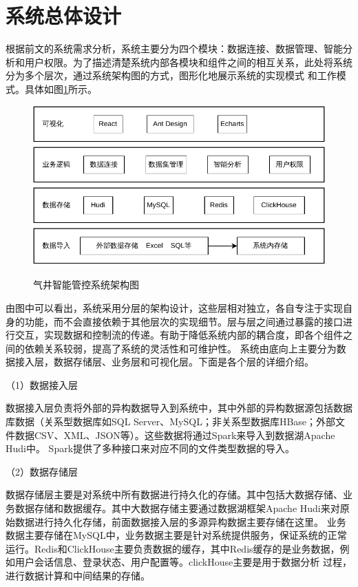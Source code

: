 \section{系统总体设计}
根据前文的系统需求分析，系统主要分为四个模块：数据连接、数据管理、智能分析和用户权限。为了描述清楚系统内部各模块和组件之间的相互关系，此处将系统分为多个层次，通过系统架构图的方式，图形化地展示系统的实现模式
和工作模式。具体如图\ref{fig:sysstruc}所示。
\begin{figure}[H]
    \centering
    \caption{气井智能管控系统架构图}
    \includegraphics{figure/系统架构图.pdf}
    \label{fig:sysstruc}
\end{figure}
由图中可以看出，系统采用分层的架构设计，这些层相对独立，各自专注于实现自身的功能，而不会直接依赖于其他层次的实现细节。层与层之间通过暴露的接口进行交互，实现数据和控制流的传递。有助于降低系统内部的耦合度，即各个组件之间的依赖关系较弱，提高了系统的灵活性和可维护性。
系统由底向上主要分为数据接入层，数据存储层、业务层和可视化层。下面是各个层的详细介绍。

（1）数据接入层

数据接入层负责将外部的异构数据导入到系统中，其中外部的异构数据源包括数据库数据（关系型数据库如SQL Server、MySQL；非关系型数据库HBase；外部文件数据CSV、XML、JSON等）。这些数据将通过Spark来导入到数据湖Apache Hudi中。
Spark提供了多种接口来对应不同的文件类型数据的导入。

（2）数据存储层

数据存储层主要是对系统中所有数据进行持久化的存储。其中包括大数据存储、业务数据存储和数据缓存。其中大数据存储主要通过数据湖框架Apache Hudi来对原始数据进行持久化存储，前面数据接入层的多源异构数据主要存储在这里。
业务数据主要存储在MySQL中，业务数据主要是针对系统提供服务，保证系统的正常运行。Redis和ClickHouse主要负责数据的缓存，其中Redis缓存的是业务数据，例如用户会话信息、登录状态、用户配置等。clickHouse主要是用于数据分析
过程，进行数据计算和中间结果的存储。

